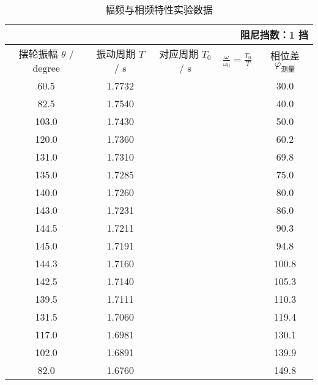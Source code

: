 \documentclass[12pt]{ctexart}
\begin{document}
    \begin{table}[hp]
        \centering
        \caption{幅频与相频特性实验数据}
        \label{table:step3}
        \begin{tabular}{|c|c|c|c|c|}
            \multicolumn{5}{r}{\small 阻尼挡数：1 挡} \\ \hline
            摆轮振幅 $\theta$ / degree & 振动周期 $T$ / s & 对应周期 $T_0$ / s & $\frac{\omega}{\omega_0} = \frac{T_0}{T}$ & 相位差 $\varphi_{\text{测量}}$ \\ \hline
            60.5 & 1.7732 & & & 30.0  \\ \hline
            82.5 & 1.7540 & & & 40.0 \\ \hline
            103.0 & 1.7430 & & & 50.0 \\ \hline
            120.0 & 1.7360 & & & 60.2 \\ \hline
            131.0 & 1.7310 & & & 69.8 \\ \hline
            135.0 & 1.7285 & & & 75.0 \\ \hline
            140.0 & 1.7260 & & & 80.0 \\ \hline
            143.0 & 1.7231 & & & 86.0 \\ \hline
            144.5 & 1.7211 & & & 90.3 \\ \hline
            145.0 & 1.7191 & & & 94.8 \\ \hline
            144.3 & 1.7160 & & & 100.8 \\ \hline
            142.5 & 1.7140 & & & 105.3 \\ \hline
            139.5 & 1.7111 & & & 110.3 \\ \hline
            131.5 & 1.7060 & & & 119.4 \\ \hline
            117.0 & 1.6981 & & & 130.1 \\ \hline
            102.0 & 1.6891 & & & 139.9 \\ \hline
            82.0 & 1.6760 & & & 149.8 \\ \hline
        \end{tabular}
    \end{table}
\end{document}
